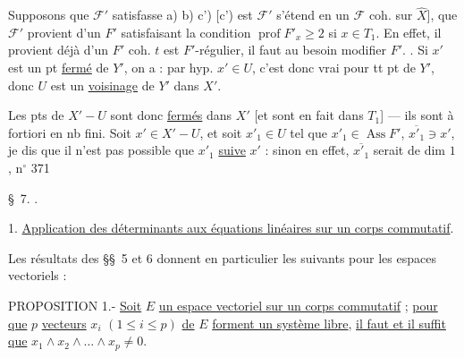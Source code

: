 Supposons que $\mathscr F'$ satisfasse a) b) c') [c') est  $\mathscr F'$ s'étend en un $\mathscr F$ coh. sur $\widehat X$],   que $\mathscr F'$ provient d'un $F'$ satisfaisant la condition $\operatorname{prof}F'_x\geq2$ si $x\in T_1$. En effet, il provient déjà d'un $F'$ coh.   $t$ est $F'$-régulier, il faut au besoin modifier $F'$.  . Si $x'$ est un pt \uline{fermé} de  $Y'$, on a : par hyp. $x'\in U$, c'est donc vrai pour tt pt de $Y'$, donc $U$ est un \uline{voisinage} de $Y'$ dans $X'$.

 Les pts de $X'-U$ sont donc \uline{fermés} dans $X'$ [et sont en fait dans $T_1$] --- ils sont à fortiori en nb fini. Soit $x'\in X'-U$, et soit  $x'_1\in U$ tel que $x'_1\in\operatorname{Ass} F'$, $\overline{x'_1}\ni x'$, je dis que  il n'est pas possible que $x'_1$ \uline{suive} $x'$ : sinon en effet, $\overline{x'_1}$ serait de dim $1$,
 \hfill n$^\circ$ 371

\S~7. .

1. \uline{Application des déterminants aux équations linéaires sur un corps commutatif}.

Les résultats des \S\S~5 et 6 donnent en particulier les suivants pour les espaces vectoriels :

PROPOSITION 1.- \uline{Soit} $E$ \uline{un espace vectoriel sur un corps commutatif} ; \uline{pour que} $p$ \uline{vecteurs} $x_i$ $(1\leq i\leq p)$ \uline{de} $E$ \uline{forment un système libre}, \uline{il faut et il suffit que} $x_1\wedge x_2\wedge\ldots\wedge x_p\ne0$.

